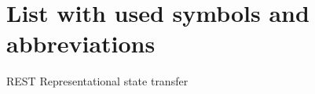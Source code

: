 
\section*{List with used symbols and abbreviations}

\begin{abbreviations}
\item[REST] Representational state transfer
\end{abbreviations}
